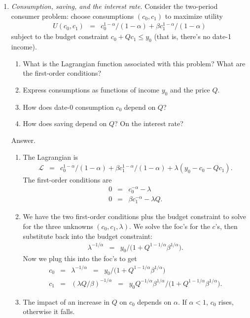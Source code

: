 \begin{enumerate}
\item {\it Consumption, saving, and the interest rate.\/}
Consider the two-period consumer problem:  choose consumptions $(c_0,c_1)$
to maximize utility
\begin{eqnarray*}
    U(c_0,c_1) &=& c_0^{1-\alpha}/(1-\alpha) + \beta c_1^{1-\alpha}/(1-\alpha)
\end{eqnarray*}
subject to the budget constraint $ c_0 + Q c_1 \leq y_0 $
(that is, there's no date-1 income).  %
%
\begin{enumerate}
\item What is the Lagrangian function associated with this problem?
What are the first-order conditions?
\item Express consumptions as functions of income $y_0$ and the
price $Q$.
\item How does date-0 consumption $c_0$ depend on $Q$?
\item How does saving depend on $Q$?  On the interest rate?
\end{enumerate}
%
Answer.
\begin{enumerate}
\item The Lagrangian is
\begin{eqnarray*}
    \mathcal{L} &=& c_0^{1-\alpha}/(1-\alpha) + \beta c_1^{1-\alpha}/(1-\alpha)
            + \lambda (y_0 - c_0 - Q c_1 ).
\end{eqnarray*}
The first-order conditions are
\begin{eqnarray*}
        0 &=& c_0^{-\alpha} - \lambda \\
        0 &=& \beta c_1^{-\alpha} - \lambda Q .
\end{eqnarray*}
\item We have the two first-order conditions plus the budget constraint
to solve for the three unknowns $(c_0,c_1,\lambda)$.
We solve the foc's for the $c$'s, then substitute back into the budget constraint:
\begin{eqnarray*}
    \lambda^{-1/\alpha} &=& y_0/ \big( 1 + Q^{1-1/\alpha} \beta^{1/\alpha} \big) .
\end{eqnarray*}
Now we plug this into the foc's to get
\begin{eqnarray*}
    c_0 &=& \lambda^{-1/\alpha}  \;\;=\;\;
            y_0/ \big( 1 + Q^{1-1/\alpha} \beta^{1/\alpha} \big) \\
    c_1 &=& (\lambda Q/\beta)^{-1/\alpha}  \;\;=\;\;
            y_0 Q^{-1/\alpha} \beta^{1/\alpha} / \big( 1 + Q^{1-1/\alpha} \beta^{1/\alpha} \big).
\end{eqnarray*}
\item The impact of an increase in $Q$ on $c_0$ depends on $\alpha$.
If $\alpha<1$, $c_0$ rises, otherwise it falls.


\end{enumerate}
\end{enumerate}
